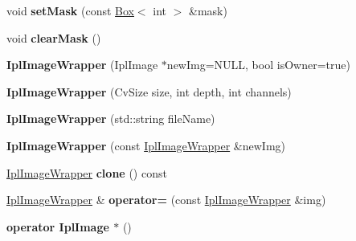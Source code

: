 \begin{DoxyCompactItemize}
\item 
\hypertarget{class_ipl_image_wrapper_a63530db687c26bfad23905e042819a11}{
void {\bfseries setMask} (const \hyperlink{class_box}{Box}$<$ int $>$ \&mask)}
\label{class_ipl_image_wrapper_a63530db687c26bfad23905e042819a11}

\item 
\hypertarget{class_ipl_image_wrapper_aa149c09b34b565c2ea31c58251a1d4c3}{
void {\bfseries clearMask} ()}
\label{class_ipl_image_wrapper_aa149c09b34b565c2ea31c58251a1d4c3}

\item 
\hypertarget{class_ipl_image_wrapper_a7516a4fcd5b663df2b8549b7b8f5c578}{
{\bfseries IplImageWrapper} (IplImage $\ast$newImg=NULL, bool isOwner=true)}
\label{class_ipl_image_wrapper_a7516a4fcd5b663df2b8549b7b8f5c578}

\item 
\hypertarget{class_ipl_image_wrapper_a2216b0bfc63dbe956a57fc4702ebf271}{
{\bfseries IplImageWrapper} (CvSize size, int depth, int channels)}
\label{class_ipl_image_wrapper_a2216b0bfc63dbe956a57fc4702ebf271}

\item 
\hypertarget{class_ipl_image_wrapper_a0eba79af9d74dd81877615d882ef1899}{
{\bfseries IplImageWrapper} (std::string fileName)}
\label{class_ipl_image_wrapper_a0eba79af9d74dd81877615d882ef1899}

\item 
\hypertarget{class_ipl_image_wrapper_a15058194f8584af51f2d3fb74ddf9797}{
{\bfseries IplImageWrapper} (const \hyperlink{class_ipl_image_wrapper}{IplImageWrapper} \&newImg)}
\label{class_ipl_image_wrapper_a15058194f8584af51f2d3fb74ddf9797}

\item 
\hypertarget{class_ipl_image_wrapper_aad2804ccc119c57efc5e445cdc40925f}{
\hyperlink{class_ipl_image_wrapper}{IplImageWrapper} {\bfseries clone} () const }
\label{class_ipl_image_wrapper_aad2804ccc119c57efc5e445cdc40925f}

\item 
\hypertarget{class_ipl_image_wrapper_a56f033380bed0a45e844b4b6d3dc35ff}{
\hyperlink{class_ipl_image_wrapper}{IplImageWrapper} \& {\bfseries operator=} (const \hyperlink{class_ipl_image_wrapper}{IplImageWrapper} \&img)}
\label{class_ipl_image_wrapper_a56f033380bed0a45e844b4b6d3dc35ff}

\item 
\hypertarget{class_ipl_image_wrapper_a6a4e72dcabb66c3577ce4c07ea1b7246}{
{\bfseries operator IplImage $\ast$} ()}
\label{class_ipl_image_wrapper_a6a4e72dcabb66c3577ce4c07ea1b7246}


\end{DoxyCompactItemize}
